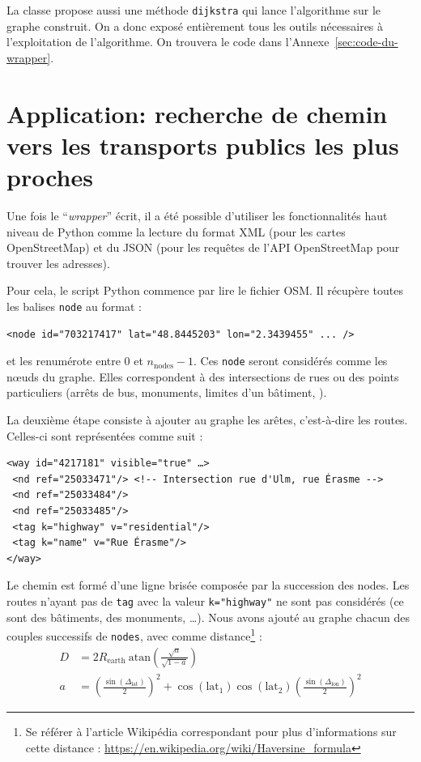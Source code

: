 \documentclass{article}
\begin{document}
La classe propose aussi une méthode \verb|dijkstra| qui lance
l'algorithme sur le graphe construit. On a donc exposé entièrement
tous les outils nécessaires à l'exploitation de l'algorithme. On
trouvera le code dans l'Annexe~\ref{sec:code-du-wrapper}.
\section{Application: recherche de chemin vers les transports publics
  les plus proches}\label{sec:appl-rech-de}
  Une fois le ``\emph{wrapper}'' écrit, il a été possible d'utiliser les
fonctionnalités haut niveau de Python comme la lecture du format XML
(pour les cartes OpenStreetMap) et du JSON (pour les requêtes de l'API
OpenStreetMap pour trouver les adresses).

Pour cela, le script Python commence par lire le fichier OSM. Il
récupère toutes les balises \verb|node| au format :
\begin{verbatim}
<node id="703217417" lat="48.8445203" lon="2.3439455" ... />
\end{verbatim}
et les renumérote entre $0$ et $n_\mathrm{nodes}-1$. Ces \verb|node|
seront considérés comme les nœuds du graphe. Elles correspondent à des
intersections de rues ou des points particuliers (arrêts de bus,
monuments, limites d'un bâtiment, ).

La deuxième étape consiste à ajouter au graphe les arêtes,
c'est-à-dire les routes. Celles-ci sont représentées comme suit :
\begin{verbatim}
<way id="4217181" visible="true" …>
 <nd ref="25033471"/> <!-- Intersection rue d'Ulm, rue Érasme -->
 <nd ref="25033484"/>
 <nd ref="25033485"/>
 <tag k="highway" v="residential"/>
 <tag k="name" v="Rue Érasme"/>
</way>
\end{verbatim}
Le chemin est formé d'une ligne brisée composée par la succession des nodes.
Les routes n'ayant pas de \verb|tag| avec la valeur \verb|k="highway"|
ne sont pas considérés (ce sont des bâtiments, des monuments, …). Nous
avons ajouté au graphe chacun des couples successifs de \verb|nodes|, avec
comme distance\footnote{Se référer à l'article Wikipédia correspondant pour plus d'informations sur cette distance : \url{https://en.wikipedia.org/wiki/Haversine_formula}} :
\begin{align*}
  D & = 2 R_\mathrm{earth}\ \mathrm{atan} \left( \frac{\sqrt{a}}{\sqrt{1-a}} \right) \\
  a & = \left( \frac{\sin(\Delta_\mathrm{lat})}{2} \right)^2 +
      \cos(\mathrm{lat_1})\cos(\mathrm{lat_2}) \left( \frac{\sin(\Delta_\mathrm{lon})}{2} \right)^2
\end{align*}
\end{document}
